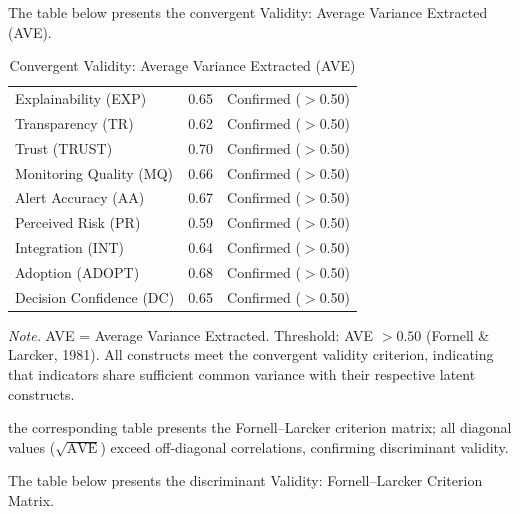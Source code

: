 \noindent The table below presents the convergent Validity: Average Variance Extracted (AVE).

\begin{table}[!htbp]
\tablestripes
\caption{Convergent Validity: Average Variance Extracted (AVE)}
\tablefontsize
\begin{tabularx}{\textwidth}{@{} >{\raggedright\arraybackslash}p{5cm} C L @{}}
\toprule
{} &  &  \\
\midrule
Explainability (EXP) & 0.65 & Confirmed ($>$0.50) \\
Transparency (TR) & 0.62 & Confirmed ($>$0.50) \\
Trust (TRUST) & 0.70 & Confirmed ($>$0.50) \\
Monitoring Quality (MQ) & 0.66 & Confirmed ($>$0.50) \\
Alert Accuracy (AA) & 0.67 & Confirmed ($>$0.50) \\
Perceived Risk (PR) & 0.59 & Confirmed ($>$0.50) \\
Integration (INT) & 0.64 & Confirmed ($>$0.50) \\
Adoption (ADOPT) & 0.68 & Confirmed ($>$0.50) \\
Decision Confidence (DC) & 0.65 & Confirmed ($>$0.50) \\
\bottomrule
\end{tabularx}
\vspace{0.5em}\noindent\textit{Note.} AVE = Average Variance Extracted. Threshold: AVE $> 0.50$ (Fornell \& Larcker, 1981). All constructs meet the convergent validity criterion, indicating that indicators share sufficient common variance with their respective latent constructs.
\end{table}

\clearpage


the corresponding table presents the Fornell--Larcker criterion matrix; all diagonal values ($\sqrt{\text{AVE}}$) exceed off-diagonal correlations, confirming discriminant validity.

\noindent The table below presents the discriminant Validity: Fornell--Larcker Criterion Matrix.

